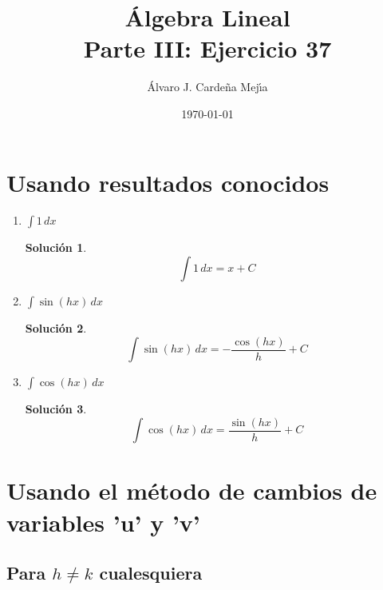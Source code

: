\documentclass[a4paper,11pt]{article}
\title{\'Algebra Lineal\\Parte III: Ejercicio 37}
\author{\'Alvaro J. Carde\~na Mej\'{\i}a}
\date{\today}
\theoremstyle{teoremas}
\theoremstyle{ejemplos}
\theoremstyle{definiciones}
\theoremstyle{lemas}
\newtheorem*{solucion}{Soluci\'on}
\begin{document}
\maketitle

\section{Usando resultados conocidos}

\begin{enumerate}
 \item $\int 1 \,dx$
 \begin{solucion}
  \begin{equation}
   \int 1 \, dx = x + C
  \end{equation}
 \end{solucion}

 \item $\int \sin(hx) \, dx$
 \begin{solucion}
  \begin{equation}
   \int \sin(hx) \, dx = -\frac{\cos(hx)}{h} + C
  \end{equation}
 \end{solucion}

 \item $\int \cos(hx) \, dx$
 \begin{solucion}
  \begin{equation}
   \int \cos(hx) \, dx = \frac{\sin(hx)}{h} + C
  \end{equation}
 \end{solucion}
 
\end{enumerate}


\section{Usando el m\'etodo de cambios de variables 'u' y 'v'}

\subsection{Para $h\neq k$ cualesquiera}
\end{document}
